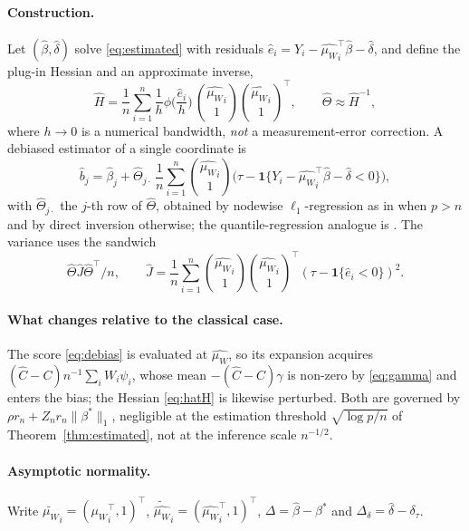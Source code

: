 \documentclass[12pt,a4paper]{article}
\theoremstyle{definition}
\theoremstyle{remark}
\newcommand{\ind}[1]{\mathbf{1}\{#1\}}
\newcommand{\betas}{\beta^*}
\newcommand{\muv}{\mu_W}
\newcommand{\Ccal}{C}
\begin{document}
\paragraph{Construction.}
Let $(\hat\beta,\hat\delta)$ solve \eqref{eq:estimated} with residuals
$\hat e_i = Y_i-{\hat{\muv}}_i^\top\hat\beta-\hat\delta$, and define the plug-in Hessian and
an approximate inverse,
\begin{equation}
\hat H = \frac1n\sum_{i=1}^n \frac{1}{h}\phi\!\Big(\frac{\hat e_i}{h}\Big)\,
\binom{{\hat{\muv}}_i}{1}\binom{{\hat{\muv}}_i}{1}^{\!\top},
\qquad
\hat\Theta \approx \hat H^{-1},
\label{eq:hatH}
\end{equation}
where $h\to0$ is a numerical bandwidth, \emph{not} a measurement-error correction. A
debiased estimator of a single coordinate is
\begin{equation}
\hat b_j = \hat\beta_j
+ \hat\Theta_{j\cdot}\,\frac1n\sum_{i=1}^n\binom{{\hat{\muv}}_i}{1}
\Big(\tau-\ind{Y_i-{\hat{\muv}}_i^\top\hat\beta-\hat\delta<0}\Big),
\label{eq:debias}
\end{equation}
with $\hat\Theta_{j\cdot}$ the $j$-th row of $\hat\Theta$, obtained by nodewise
$\ell_1$-regression as in \citet{vandegeer2014asymptotically} when $p>n$ and by direct
inversion otherwise; the quantile-regression analogue is \citet{bradic2017uniform}. The
variance uses the sandwich
\begin{equation}
\hat\Theta\hat J\hat\Theta^\top/n,
\qquad
\hat J = \frac1n\sum_{i=1}^n\binom{{\hat{\muv}}_i}{1}\binom{{\hat{\muv}}_i}{1}^\top
(\tau-\ind{\hat e_i<0})^2 .
\label{eq:debias-var}
\end{equation}

\paragraph{What changes relative to the classical case.}
The score \eqref{eq:debias} is evaluated
at $\hat{\muv}$, so its expansion acquires
$(\hat\Ccal-\Ccal)n^{-1}\sum_iW_i\psi_i$, whose mean $-(\hat\Ccal-\Ccal)\gamma$ is non-zero
by \eqref{eq:gamma} and enters the bias; the Hessian \eqref{eq:hatH} is likewise perturbed.
Both are governed by $\rho r_n+Z_nr_n\|\betas\|_1$, negligible at the estimation threshold
$\sqrt{\log p/n}$ of Theorem~\ref{thm:estimated}, not at the inference scale $n^{-1/2}$.

\paragraph{Asymptotic normality.}
Write ${\tilde{\muv}}_i=({\muv}_i^\top,1)^\top$,
${\tilde{\hat{\muv}}}_i=({\hat{\muv}}_i^\top,1)^\top$, $\Delta=\hat\beta-\betas$ and
$\Delta_\delta=\hat\delta-\delta_\tau$.
\end{document}
